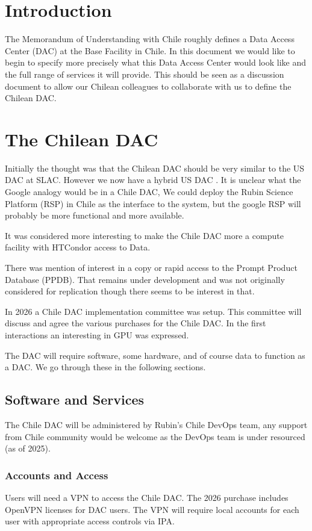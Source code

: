 \section{Introduction}

The Memorandum of Understanding with Chile  roughly defines a Data Access Center (DAC) at the Base Facility in Chile.
In this document we would like to begin to specify more precisely what this Data Access Center would look like and the full range of services it will provide.
This should be seen as a discussion document to allow our Chilean colleagues to collaborate with us to define the Chilean DAC.

\section{The Chilean DAC}

Initially the thought was that the Chilean DAC should be very similar to the US DAC at SLAC.
However we now have a hybrid US DAC \cite{DMTN-287}.
It is unclear what the Google analogy would be in a Chile DAC,
We could deploy the Rubin  Science Platform (RSP) in Chile as the interface to the system,
but the google RSP will probably be more functional and more available.

It was considered more interesting to make the Chile DAC more a compute facility with HTCondor access to Data.

There was mention of interest in a copy or rapid access to the Prompt Product Database (PPDB).
That remains under development and was not originally considered for replication though there seems to be interest in that.

In 2026 a Chile DAC implementation committee was setup.
This committee will discuss and agree the various purchases for the Chile DAC.
In the first interactions an interesting in GPU was expressed.

The DAC will require  software, some  hardware, and of course data to function as a DAC.
We go through these in the following sections.

\subsection{Software and Services}
The Chile DAC will be administered  by Rubin's Chile DevOps team, any support from Chile community would be welcome as the DevOps team is under resourced (as of 2025).

\subsubsection{Accounts and Access }
Users will need a VPN to access the Chile DAC.
The 2026 purchase includes OpenVPN licenses for DAC users.
The VPN will require local accounts for each user with appropriate access controls via IPA.

